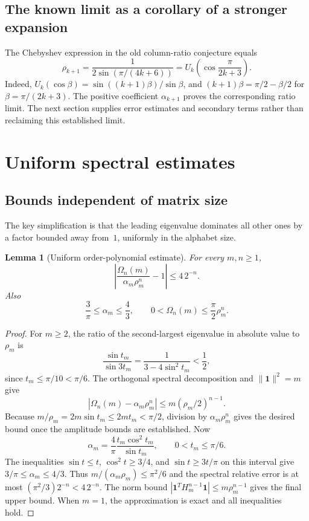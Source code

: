 \documentclass[11pt,a4paper]{article}
\newtheorem{lemma}[theorem]{Lemma}
\theoremstyle{definition}
\newcommand{\Om}{\Omega}
\newcommand{\one}{\mathbf{1}}
\begin{document}
\subsection{The known limit as a corollary of a stronger expansion}
The Chebyshev expression in the old column-ratio conjecture equals
\begin{equation}\label{zz:eq:ratio-old}
 \rho_{k+1}=\frac1{2\sin(\pi/(4k+6))}
 =U_k\left(\cos\frac{\pi}{2k+3}\right).
\end{equation}
Indeed, $U_k(\cos\beta)=\sin((k+1)\beta)/\sin\beta$, and
$(k+1)\beta=\pi/2-\beta/2$ for $\beta=\pi/(2k+3)$.
The positive coefficient $\alpha_{k+1}$ proves the corresponding ratio limit.
The next section supplies error estimates and secondary terms rather than
reclaiming this established limit.

\section{Uniform spectral estimates}
\label{zz:sec:uniform}
\subsection{Bounds independent of matrix size}
The key simplification is that the leading eigenvalue dominates all other
ones by a factor bounded away from~$1$, uniformly in the alphabet size.

\begin{lemma}[Uniform order-polynomial estimate]
\label{zz:lem:uniform-omega}
For every $m,n\ge1$,
\begin{equation}\label{zz:eq:omega-uniform}
 \left|\frac{\Om_n(m)}{\alpha_m\rho_m^n}-1\right|
 \le4\,2^{-n}.
\end{equation}
Also
\begin{equation}\label{zz:eq:uniform-constants}
 \frac3\pi\le\alpha_m\le\frac43,\qquad
 0<\Om_n(m)\le\frac\pi2\rho_m^n.
\end{equation}
\end{lemma}
\begin{proof}
For $m\ge2$, the ratio of the second-largest eigenvalue in absolute value to
$\rho_m$ is
\[
 \frac{\sin t_m}{\sin3t_m}
 =\frac1{3-4\sin^2t_m}<\frac12,
\]
since $t_m\le\pi/10<\pi/6$.
The orthogonal spectral decomposition and $\|\one\|^2=m$ give
\[
 |\Om_n(m)-\alpha_m\rho_m^n|
 \le m(\rho_m/2)^{n-1}.
\]
Because $m/\rho_m=2m\sin t_m\le2mt_m<\pi/2$, division by
$\alpha_m\rho_m^n$ gives the desired bound once the amplitude bounds are
established.  Now
\[
 \alpha_m=\frac4\pi\frac{t_m\cos^2t_m}{\sin t_m},\qquad
 0<t_m\le\pi/6.
\]
The inequalities $\sin t\le t$, $\cos^2t\ge3/4$, and
$\sin t\ge3t/\pi$ on this interval give
$3/\pi\le\alpha_m\le4/3$.
Thus $m/(\alpha_m\rho_m)\le\pi^2/6$ and the spectral relative error is
at most $(\pi^2/3)2^{-n}<4\,2^{-n}$.
The norm bound $|\one^TH_m^{n-1}\one|\le m\rho_m^{n-1}$ gives the final
upper bound.  When $m=1$, the approximation is exact and all inequalities hold.
\end{proof}
\end{document}
